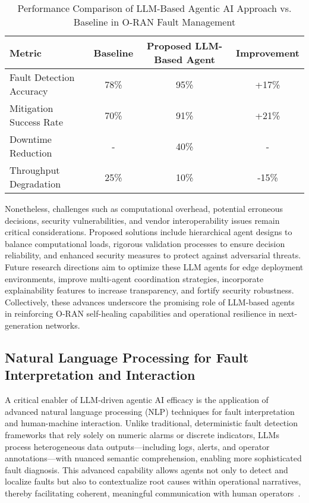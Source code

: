 \documentclass[sigconf]{acmart}
\begin{document}
\begin{table*}[htbp]
\centering
\caption{Performance Comparison of LLM-Based Agentic AI Approach vs. Baseline in O-RAN Fault Management}
\label{tab:LLMAgentPerformance}
\begin{adjustbox}{max width=\textwidth}
\begin{tabular}{@{}lccc@{}}
\toprule
Metric & Baseline & Proposed LLM-Based Agent & Improvement \\
\midrule
Fault Detection Accuracy & 78\% & 95\% & +17\% \\
Mitigation Success Rate & 70\% & 91\% & +21\% \\
Downtime Reduction & - & 40\% & - \\
Throughput Degradation & 25\% & 10\% & -15\% \\
\bottomrule
\end{tabular}
\end{adjustbox}
\end{table*}

Nonetheless, challenges such as computational overhead, potential erroneous decisions, security vulnerabilities, and vendor interoperability issues remain critical considerations. Proposed solutions include hierarchical agent designs to balance computational loads, rigorous validation processes to ensure decision reliability, and enhanced security measures to protect against adversarial threats. Future research directions aim to optimize these LLM agents for edge deployment environments, improve multi-agent coordination strategies, incorporate explainability features to increase transparency, and fortify security robustness. Collectively, these advances underscore the promising role of LLM-based agents in reinforcing O-RAN self-healing capabilities and operational resilience in next-generation networks.

\subsection{Natural Language Processing for Fault Interpretation and Interaction}

A critical enabler of LLM-driven agentic AI efficacy is the application of advanced natural language processing (NLP) techniques for fault interpretation and human-machine interaction. Unlike traditional, deterministic fault detection frameworks that rely solely on numeric alarms or discrete indicators, LLMs process heterogeneous data outputs—including logs, alerts, and operator annotations—with nuanced semantic comprehension, enabling more sophisticated fault diagnosis. This advanced capability allows agents not only to detect and localize faults but also to contextualize root causes within operational narratives, thereby facilitating coherent, meaningful communication with human operators~\cite{ref55}. 
\end{document}
